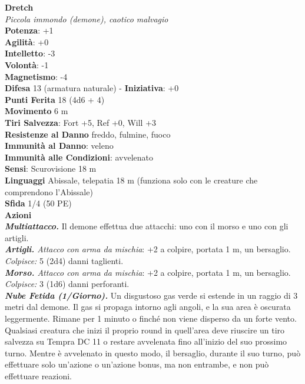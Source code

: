 \begin{multicols}{2}
\medskip\textbf{Dretch}\\
\emph{Piccola immondo (demone), caotico malvagio}\\
\textbf{Potenza}: +1\\
\textbf{Agilità}: +0\\
\textbf{Intelletto}: -3\\
\textbf{Volontà}: -1\\
\textbf{Magnetismo}: -4\\
\textbf{Difesa} 13 (armatura naturale) - \textbf{Iniziativa}: +0\\
\textbf{Punti Ferita} 18 (4d6 + 4)\\
\textbf{Movimento} 6 m\\
\textbf{Tiri Salvezza}: Fort +5, Ref +0, Will +3\\
\textbf{Resistenze al Danno} freddo, fulmine, fuoco\\
\textbf{Immunità al Danno}: veleno\\
\textbf{Immunità alle Condizioni}: avvelenato\\
\textbf{Sensi}: Scurovisione 18 m\\
\textbf{Linguaggi} Abissale, telepatia 18 m (funziona solo con le creature che comprendono l'Abissale)\\
\textbf{Sfida} 1/4 (50 PE)\smallskip\\
\smallskip\textbf{Azioni}\\
\emph{\textbf{Multiattacco.}} Il demone effettua due attacchi: uno con il morso e uno con gli artigli.\\
\emph{\textbf{Artigli.} Attacco con arma da mischia}: +2 a colpire, portata 1 m, un bersaglio.\\
\emph{Colpisce:} 5 (2d4) danni taglienti.\\
\emph{\textbf{Morso.} Attacco con arma da mischia}: +2 a colpire, portata 1 m, un bersaglio.\\
\emph{Colpisce:} 3 (1d6) danni perforanti.\\
\emph{\textbf{Nube Fetida (1/Giorno).}} Un disgustoso gas verde si estende in un raggio di 3 metri dal demone. Il gas si propaga intorno agli angoli, e la sua area è oscurata leggermente. Rimane per 1 minuto o finché non viene disperso da un forte vento. Qualsiasi creatura che inizi il proprio round in quell'area deve riuscire un tiro salvezza su Tempra DC 11 o restare avvelenata fino all'inizio del suo prossimo turno. Mentre è avvelenato in questo modo, il bersaglio, durante il suo turno, può effettuare solo un'azione o un'azione bonus, ma non entrambe, e non può effettuare reazioni.\\

\end{multicols}
